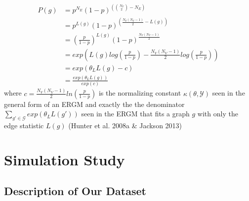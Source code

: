 \documentclass[12pt,twoside]{amherstthesis}
\begin{document}
  \[
  \begin{aligned}
  P(g) &= p^{N_E}(1 - p)^{\left({N_V \choose 2} - N_E \right)} \\
  &= p^{L(g)}(1 - p)^{\left(\frac {N_{V}(N_{V} - 1)} {2} - L(g) \right)} \\
  &= \left( \frac {p} {1-p} \right)^{L(g)}(1 - p)^{\frac {N_{V}(N_{V} - 1)} {2}} \\
  &= exp \left(L(g)log \left(\frac {p} {1-p} \right) - \frac {N_{V}(N_{V} - 1)} {2} log \left( \frac {p} {1-p} \right) \right) \\
  &= exp(\theta_{L}L(g) - c) \\
  &= \frac {exp(\theta_{L}L(g))} {exp(c)}
  \end{aligned} 
  \] where
  \(c = \frac {N_{V}(N_{V} - 1)} {2} ln \left( \frac {p} {1-p} \right)\)
  is the normalizing constant \(\kappa(\theta, \mathcal{Y})\) seen in the
  general form of an ERGM and exactly the the denominator
  \(\sum_{g' \in \mathcal{G}}^{} exp(\theta_{L}L(g'))\) seen in the ERGM
  that fits a graph \(g\) with only the edge statistic \(L(g)\) (Hunter et
  al. 2008a \& Jackson 2013)
  
  \chapter{Simulation Study}\label{simulation-study}
  
  \section{Description of Our Dataset}\label{description-of-our-dataset}
  
\end{document}
